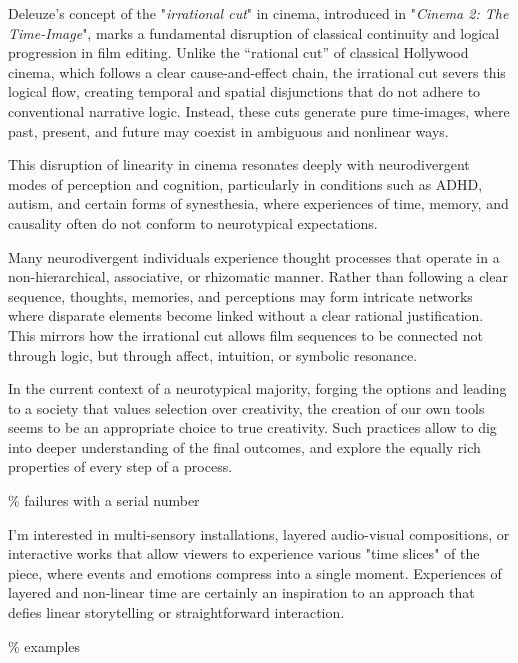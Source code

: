 Deleuze's concept of the "\textit{irrational cut}" in cinema, introduced in "\textit{Cinema 2: The Time-Image}", marks a fundamental disruption of classical continuity and logical progression in film editing. Unlike the “rational cut” of classical Hollywood cinema, which follows a clear cause-and-effect chain, the irrational cut severs this logical flow, creating temporal and spatial disjunctions that do not adhere to conventional narrative logic. Instead, these cuts generate pure time-images, where past, present, and future may coexist in ambiguous and nonlinear ways.

This disruption of linearity in cinema resonates deeply with neurodivergent modes of perception and cognition, particularly in conditions such as ADHD, autism, and certain forms of synesthesia, where experiences of time, memory, and causality often do not conform to neurotypical expectations.

Many neurodivergent individuals experience thought processes that operate in a non-hierarchical, associative, or rhizomatic manner. Rather than following a clear sequence, thoughts, memories, and perceptions may form intricate networks where disparate elements become linked without a clear rational justification. This mirrors how the irrational cut allows film sequences to be connected not through logic, but through affect, intuition, or symbolic resonance.

In the current context of a neurotypical majority, forging the options and leading to a society that values selection over creativity, the creation of our own tools seems to be an appropriate choice to true creativity. Such practices allow to dig into deeper understanding of the final outcomes, and explore the equally rich properties of every step of a process.   

{\scriptsize \textcolor{comment}{\% failures with a serial number}}


I'm interested in multi-sensory installations, layered audio-visual compositions, or interactive works that allow viewers to experience various "time slices" of the piece, where events and emotions compress into a single moment. Experiences of layered and non-linear time are certainly an inspiration to an approach that defies linear storytelling or straightforward interaction.

{\scriptsize \textcolor{comment}{\% examples}}

